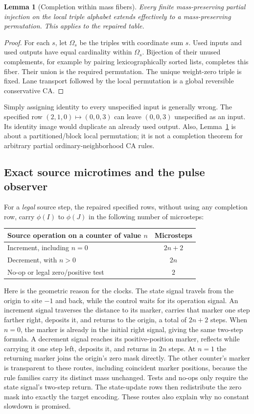 \documentclass[11pt,letterpaper]{article}
\numberwithin{equation}{section}
\newtheorem{lemma}[theorem]{Lemma}
\theoremstyle{definition}
\theoremstyle{remark}
\begin{document}
\begin{lemma}[Completion within mass fibers]\label{smc:sl:lem:completion}
Every finite mass-preserving partial injection on the local triple alphabet extends effectively to a mass-preserving permutation. This applies to the repaired table.
\end{lemma}
\begin{proof}
For each $s$, let $\Omega_s$ be the triples with coordinate sum $s$. Used inputs and used outputs have equal cardinality within $\Omega_s$. Bijection of their unused complements, for example by pairing lexicographically sorted lists, completes this fiber. Their union is the required permutation. The unique weight-zero triple is fixed. Lane transport followed by the local permutation is a global reversible conservative CA.
\end{proof}
Simply assigning identity to every unspecified input is generally wrong. The specified row $(2,1,0)\mapsto(0,0,3)$ can leave $(0,0,3)$ unspecified as an input. Its identity image would duplicate an already used output. Also, Lemma~\ref{smc:sl:lem:completion} is about a partitioned/block local permutation; it is not a completion theorem for arbitrary partial ordinary-neighborhood CA rules.

\subsection{Exact source microtimes and the pulse observer}
For a \emph{legal} source step, the repaired specified rows, without using any completion row, carry $\phi(I)$ to $\phi(J)$ in the following number of microsteps:
\begin{center}
\begin{tabular}{@{}lc@{}}
\toprule
Source operation on a counter of value $n$ & Microsteps\\\midrule
Increment, including $n=0$ & $2n+2$\\
Decrement, with $n>0$ & $2n$\\
No-op or legal zero/positive test & $2$\\\bottomrule
\end{tabular}
\end{center}
Here is the geometric reason for the clocks. The state signal travels from the origin to site $-1$ and back, while the control waits for its operation signal. An increment signal traverses the distance to its marker, carries that marker one step farther right, deposits it, and returns to the origin, a total of $2n+2$ steps. When $n=0$, the marker is already in the initial right signal, giving the same two-step formula. A decrement signal reaches its positive-position marker, reflects while carrying it one step left, deposits it, and returns in $2n$ steps. At $n=1$ the returning marker joins the origin's zero mask directly. The other counter's marker is transparent to these routes, including coincident marker positions, because the rule families carry its distinct mass unchanged. Tests and no-ops only require the state signal's two-step return. The state-update rows then redistribute the zero mask into exactly the target encoding. These routes also explain why no constant slowdown is promised.
\end{document}
